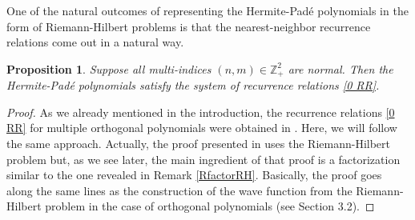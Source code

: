 \documentclass{amsart}
\newtheorem{proposition}[theorem]{Proposition}
\theoremstyle{remark}
\numberwithin{equation}{section}
\begin{document}
One of the natural outcomes of representing the {Her\-mite-Pad\'e}{} polynomials in the form of Riemann-Hilbert problems
is that the nearest-neighbor recurrence relations come out in a natural way.

\begin{proposition} \label{thm:1}
Suppose all multi-indices $(n,m) \in{{\mathbb Z}}_+^2$ are normal.
Then the {Her\-mite-Pad\'e}{}  polynomials satisfy the system of recurrence
relations \eqref{0 RR}.
\end{proposition}
\begin{proof} As we already mentioned in the introduction, the recurrence relations \eqref{0 RR} for multiple orthogonal polynomials were obtained in \cite{vanA2011}. Here, we will follow the same approach.
Actually, the proof presented in \cite{vanA2011} uses the Riemann-Hilbert problem but, as we see later, the main ingredient of that proof
is a factorization similar to the one revealed in Remark \ref{RfactorRH}. Basically,
the proof goes along the same lines as the construction of the wave function from the Riemann-Hilbert
problem in the case of orthogonal polynomials (see Section 3.2).


\end{proof}
\end{document}
